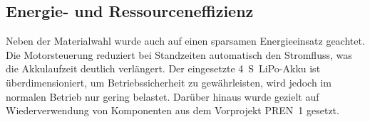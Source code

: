 \documentclass[main.tex]{subfiles} %
\begin{document}

\subsection{Energie- und Ressourceneffizienz}

Neben der Materialwahl wurde auch auf einen sparsamen Energieeinsatz geachtet. 
Die Motorsteuerung reduziert bei Standzeiten automatisch den Stromfluss, was die 
Akkulaufzeit deutlich verlängert. Der eingesetzte \SI{4}{S}~LiPo-Akku ist überdimensioniert, 
um Betriebssicherheit zu gewährleisten, wird jedoch im normalen Betrieb nur gering belastet. 
Darüber hinaus wurde gezielt auf Wiederverwendung von Komponenten aus dem Vorprojekt PREN~1 
gesetzt.
\end{document}
